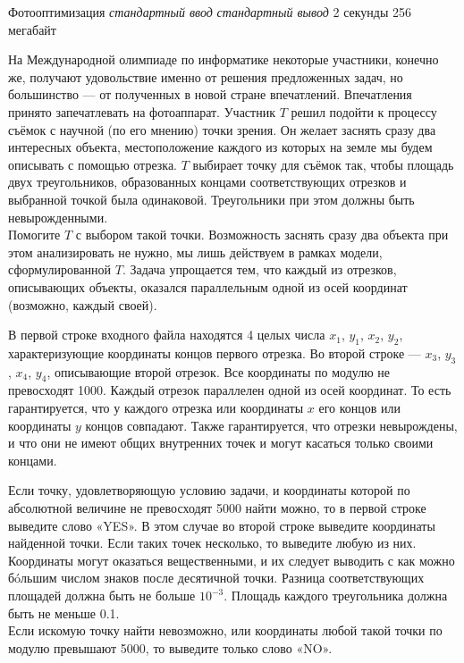 \begin{problem}%
{Фотооптимизация}%
{\textsl{стандартный ввод}}%
{\textsl{стандартный вывод}}%
{2 секунды}%
{256 мегабайт}{}

На Международной олимпиаде по информатике некоторые участники, конечно же, получают удовольствие именно от решения предложенных задач, но большинство — от полученных в новой стране впечатлений. Впечатления принято запечатлевать на фотоаппарат. Участник $T$ решил подойти к процессу съёмок с научной (по его мнению) точки зрения. Он желает заснять сразу два интересных объекта, местоположение каждого из которых на земле мы будем описывать с помощью отрезка. $T$ выбирает точку для съёмок так, чтобы площадь двух треугольников, образованных концами соответствующих отрезков и выбранной точкой была одинаковой. Треугольники при этом должны быть невырожденными.\\

Помогите $T$ с выбором такой точки. Возможность заснять сразу два объекта при этом анализировать не нужно, мы лишь действуем в рамках модели, сформулированной $T$. Задача упрощается тем, что каждый из отрезков, описывающих объекты, оказался параллельным одной из осей координат (возможно, каждый своей).

\InputFile

В первой строке входного файла находятся 4 целых числа $x_1$, $y_1$, $x_2$, $y_2$, характеризующие координаты концов первого отрезка. Во второй строке — $x_3$, $y_3$, $x_4$, $y_4$, описывающие второй отрезок. Все координаты по модулю не превосходят 1000. Каждый отрезок параллелен одной из осей координат. То есть гарантируется, что у каждого отрезка или координаты $x$ его концов или координаты $y$ концов совпадают. Также гарантируется, что отрезки невырождены, и что они не имеют общих внутренних точек и могут касаться только своими концами.

\OutputFile

Если точку, удовлетворяющую условию задачи, и координаты которой по абсолютной величине не превосходят 5000 найти можно, то в первой строке выведите слово «YES». В этом случае во второй строке выведите координаты найденной точки. Если таких точек несколько, то выведите любую из них. Координаты могут оказаться вещественными, и их следует выводить с как можно бóльшим числом знаков после десятичной точки. Разница соответствующих площадей должна быть не больше $10^{-3}$. Площадь каждого треугольника должна быть не меньше 0.1.\\

Если искомую точку найти невозможно, или координаты любой такой точки по модулю превышают 5000, то выведите только слово «NO».

\Examples

\begin{example}
%
%
\end{example}
\end{problem}